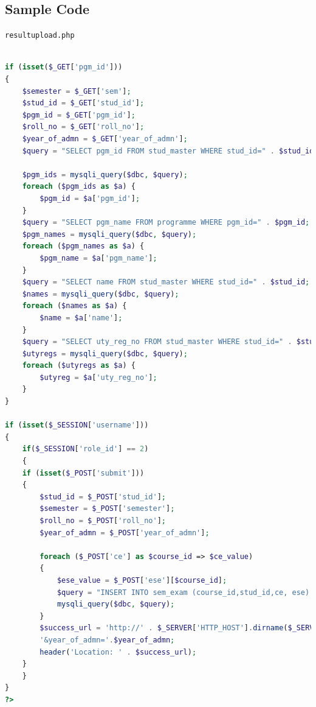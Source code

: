 \documentclass{nascproject}
\begin{document}
\nocite{dbbook}
\nocite{se}
\nocite{head}
\nocite{php}
\nocite{se1}
\nocite{html}
\nocite{java}
\nocite{tutorial1}
\nocite{tutorial2}




\begin{appendices}
\chapter{Sample Code}

\texttt{resultupload.php}
\begin{lstlisting}[language=php]

if (isset($_GET['pgm_id'])) 
{
    $semester = $_GET['sem'];
    $stud_id = $_GET['stud_id'];
    $pgm_id = $_GET['pgm_id'];
    $roll_no = $_GET['roll_no'];
    $year_of_admn = $_GET['year_of_admn'];
    $query = "SELECT pgm_id FROM stud_master WHERE stud_id=" . $stud_id;

    $pgm_ids = mysqli_query($dbc, $query);
    foreach ($pgm_ids as $a) {
        $pgm_id = $a['pgm_id'];
    }
    $query = "SELECT pgm_name FROM programme WHERE pgm_id=" . $pgm_id;
    $pgm_names = mysqli_query($dbc, $query);
    foreach ($pgm_names as $a) {
        $pgm_name = $a['pgm_name'];
    }
    $query = "SELECT name FROM stud_master WHERE stud_id=" . $stud_id;
    $names = mysqli_query($dbc, $query);
    foreach ($names as $a) {
        $name = $a['name'];
    }
    $query = "SELECT uty_reg_no FROM stud_master WHERE stud_id=" . $stud_id;
    $utyregs = mysqli_query($dbc, $query);
    foreach ($utyregs as $a) {
        $utyreg = $a['uty_reg_no'];
    }
}

if (isset($_SESSION['username'])) 
{ 
    if($_SESSION['role_id'] == 2)
    {
    if (isset($_POST['submit']))  
    {
        $stud_id = $_POST['stud_id'];
        $semester = $_POST['semester'];
        $roll_no = $_POST['roll_no'];
        $year_of_admn = $_POST['year_of_admn'];
        
        foreach ($_POST['ce'] as $course_id => $ce_value) 
        {
            $ese_value = $_POST['ese'][$course_id];
            $query = "INSERT INTO sem_exam (course_id,stud_id,ce, ese) VALUES ('$course_id','$stud_id','$ce_value', '$ese_value')";
            mysqli_query($dbc, $query);
        }
        $success_url = 'http://' . $_SERVER['HTTP_HOST'].dirname($_SERVER['PHP_SELF']) . '/resultuploadsuccess.php?'.'stud_id='.$stud_id.'&roll_no='.$roll_no.'&sem='.$semester.
        '&year_of_admn='.$year_of_admn;
        header('Location: ' . $success_url);  
    } 
    }
}
?>


\end{lstlisting}
\end{appendices}
\end{document}
